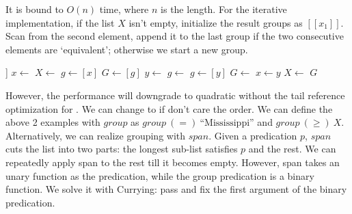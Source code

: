 \documentclass[b5paper]{article}
\begin{document}
\be
{}
\ee

It is bound to $O(n)$ time, where $n$ is the length. For the iterative implementation, if the list $X$ isn't empty, initialize the result groups as $[[x_1]]$. Scan from the second element, append it to the last group if the two consecutive elements are `equivalent'; otherwise we start a new group.

\begin{algorithmic}[1]
    \State \Return [[\ ]]
  \EndIf
  \State $x \gets$ 
  \State $X \gets$ 
  \State $g \gets [x]$
  \State $G \gets [g]$
    \State $y \gets$ 
      \State $g \gets $ 
    \Else
      \State $g \gets [y]$
      \State $G \gets$ 
    \EndIf
    \State $x \gets y$
    \State $X \gets$ 
  \EndWhile
  \State \Return $G$
\EndFunction
\end{algorithmic}

However, the performance will downgrade to quadratic without the tail reference optimization for . We can change to  if don't care the order. We can define the above 2 examples with $group$ as $\textit{group}\ (=)\ \text{``Mississippi''}$ and $\textit{group}\ (\geq)\ X$. Alternatively, we can realize grouping with $span$. Given a predication $p$, $span$ cuts the list into two parts: the longest sub-list satisfies $p$ and the rest. We can repeatedly apply span to the rest till it becomes empty. However, span takes an unary function as the predication, while the group predication is a binary function. We solve it with Currying: pass and fix the first argument of the binary predication.

\be
{}
\ee
\end{document}
